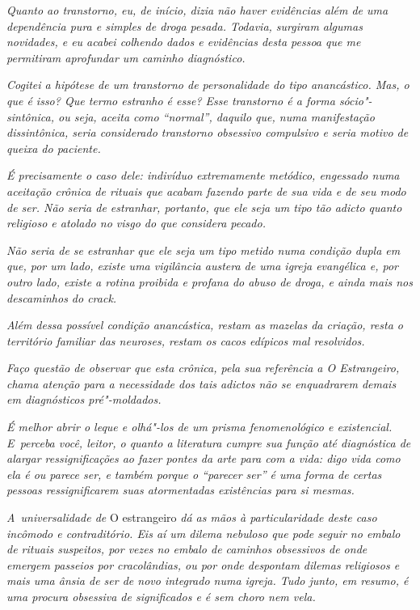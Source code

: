 \emph{Quanto ao transtorno, eu, de início, dizia não haver evidências
além de uma dependência pura e simples de droga pesada. Todavia,
surgiram algumas novidades, e eu acabei colhendo dados e evidências
desta pessoa que me permitiram aprofundar um caminho diagnóstico.}

\emph{Cogitei a hipótese de um transtorno de personalidade do tipo
anancástico. Mas, o que é isso? Que termo estranho é esse? Esse
transtorno é a forma sócio"-sintônica, ou seja, aceita como ``normal'',
daquilo que, numa manifestação dissintônica, seria considerado
transtorno obsessivo compulsivo e seria motivo de queixa do paciente.}

\emph{É precisamente o caso dele: indivíduo extremamente metódico,
engessado numa aceitação crônica de rituais que acabam fazendo parte de
sua vida e de seu modo de ser. Não seria de estranhar, portanto, que ele
seja um tipo tão adicto quanto religioso e atolado no visgo do que
considera pecado.}

\emph{Não seria de se estranhar que ele seja um tipo metido numa
condição dupla em que, por um lado, existe uma vigilância austera de uma
igreja evangélica e, por outro lado, existe a rotina proibida e profana
do abuso de droga, e ainda mais nos descaminhos do crack.}

\emph{Além dessa possível condição anancástica, restam as mazelas da
criação, resta o território familiar das neuroses, restam os cacos
edípicos mal resolvidos.}

\emph{Faço questão de observar que esta crônica, pela sua referência a \emph{O
Estrangeiro}, chama atenção para a necessidade dos tais adictos não se
enquadrarem demais em diagnósticos pré"-moldados.}

\emph{É melhor abrir o leque e olhá"-los de um prisma fenomenológico e
existencial. E~perceba você, leitor, o quanto a literatura cumpre sua
função até diagnóstica de alargar ressignificações ao fazer pontes da
arte para com a vida: digo vida como ela é ou parece ser, e também
porque o ``parecer ser'' é uma forma de certas pessoas ressignificarem
suas atormentadas existências para si mesmas.}

\emph{A~universalidade de} O estrangeiro \emph{dá as mãos à particularidade
deste caso incômodo e contraditório. Eis aí um dilema nebuloso que pode
seguir no embalo de rituais suspeitos, por vezes no embalo de caminhos
obsessivos de onde emergem passeios por cracolândias, ou por onde
despontam dilemas religiosos e mais uma ânsia de ser de novo integrado
numa igreja. Tudo junto, em resumo, é uma procura obsessiva de
significados e é sem choro nem vela.}
